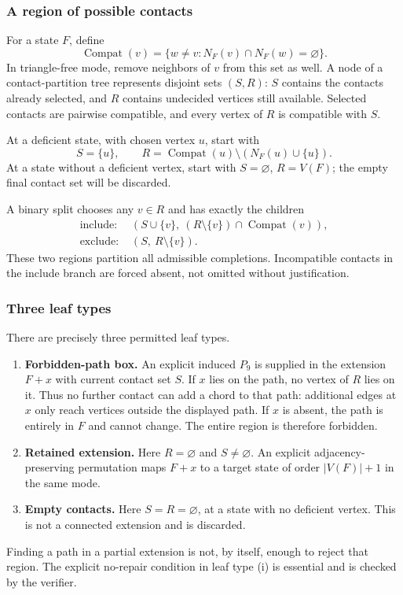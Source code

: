 \documentclass[11pt,a4paper]{article}
\theoremstyle{definition}\newtheorem{definition}[theorem]{Definition}
\theoremstyle{remark}\newtheorem{remark}[theorem]{Remark}
\begin{document}
\subsubsection{A region of possible contacts}
For a state $F$, define
\[
 \operatorname{Compat}(v)=\{w\ne v:N_F(v)\cap N_F(w)=\varnothing\}.
\]
In triangle-free mode, remove neighbors of $v$ from this set as well.
A node of a contact-partition tree represents disjoint sets $(S,R)$:
$S$ contains the contacts already selected, and $R$ contains undecided
vertices still available. Selected contacts are pairwise compatible,
and every vertex of $R$ is compatible with $S$.

At a deficient state, with chosen vertex $u$, start with
\[
 S=\{u\},\qquad R=\operatorname{Compat}(u)\setminus(N_F(u)\cup\{u\}).
\]
At a state without a deficient vertex, start with
$S=\varnothing$, $R=V(F)$; the empty final contact set will be discarded.

A binary split chooses any $v\in R$ and has exactly the children
\begin{align*}
 \text{include: }&(S\cup\{v\},\ (R\setminus\{v\})\cap\operatorname{Compat}(v)),\\
 \text{exclude: }&(S,\ R\setminus\{v\}).
\end{align*}
These two regions partition all admissible completions. Incompatible
contacts in the include branch are forced absent, not omitted without
justification.

\subsubsection{Three leaf types}
There are precisely three permitted leaf types.
\begin{enumerate}[label=\textup{(\roman*)}]
\item \textbf{Forbidden-path box.} An explicit induced $P_9$ is supplied
in the extension $F+x$ with current contact set $S$. If $x$ lies on the
path, no vertex of $R$ lies on it. Thus no further contact can add a
chord to that path: additional edges at $x$ only reach vertices outside
the displayed path. If $x$ is absent, the path is entirely in $F$ and
cannot change. The entire region is therefore forbidden.
\item \textbf{Retained extension.} Here $R=\varnothing$ and
$S\ne\varnothing$. An explicit adjacency-preserving permutation maps
$F+x$ to a target state of order $|V(F)|+1$ in the same mode.
\item \textbf{Empty contacts.} Here $S=R=\varnothing$, at a state with
no deficient vertex. This is not a connected extension and is discarded.
\end{enumerate}
Finding a path in a partial extension is not, by itself, enough to
reject that region. The explicit no-repair condition in leaf type
(i) is essential and is checked by the verifier.
\end{document}
